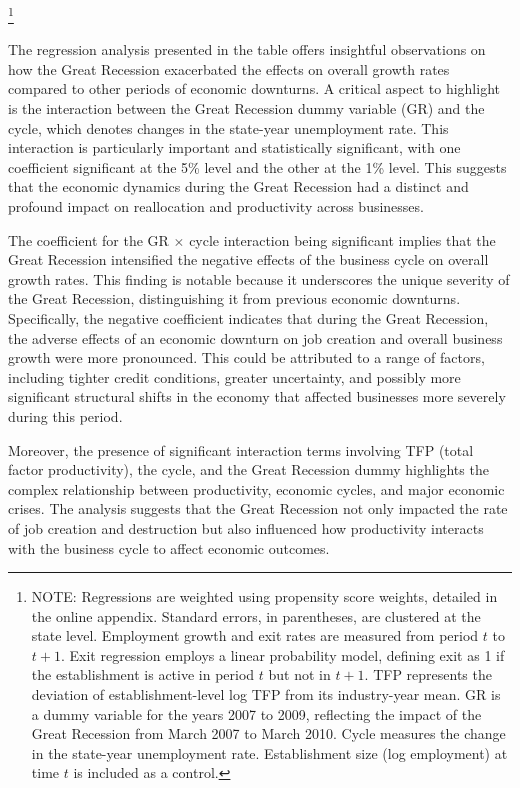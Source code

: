 \documentclass[12pt]{article}
\begin{document}
\begin{table}[ht]
    \footnote{NOTE: Regressions are weighted using propensity score weights, detailed in the online appendix. Standard errors, in parentheses, are clustered at the state level. Employment growth and exit rates are measured from period $t$ to $t+1$. Exit regression employs a linear probability model, defining exit as 1 if the establishment is active in period $t$ but not in $t+1$. TFP represents the deviation of establishment-level log TFP from its industry-year mean. GR is a dummy variable for the years 2007 to 2009, reflecting the impact of the Great Recession from March 2007 to March 2010. Cycle measures the change in the state-year unemployment rate. Establishment size (log employment) at time $t$ is included as a control.}  
\end{table}
The regression analysis presented in the table offers insightful observations on how the Great Recession exacerbated the
effects on overall growth rates compared to other periods of economic downturns. A critical aspect to highlight is the
interaction between the Great Recession dummy variable (GR) and the cycle, which denotes changes in the state-year
unemployment rate. This interaction is particularly important and statistically significant, with one coefficient
significant at the 5\% level and the other at the 1\% level. This suggests that the economic dynamics during the Great
Recession had a distinct and profound impact on reallocation and productivity across businesses. 

The coefficient for the GR $\times$ cycle interaction being significant implies that the Great Recession intensified the
negative effects of the business cycle on overall growth rates. This finding is notable because it underscores the
unique severity of the Great Recession, distinguishing it from previous economic downturns. Specifically, the negative
coefficient indicates that during the Great Recession, the adverse effects of an economic downturn on job creation and
overall business growth were more pronounced. This could be attributed to a range of factors, including tighter credit
conditions, greater uncertainty, and possibly more significant structural shifts in the economy that affected businesses
more severely during this period. 

Moreover, the presence of significant interaction terms involving TFP (total factor productivity), the cycle, and the
Great Recession dummy highlights the complex relationship between productivity, economic cycles, and major economic
crises. The analysis suggests that the Great Recession not only impacted the rate of job creation and destruction but
also influenced how productivity interacts with the business cycle to affect economic outcomes. 
\end{document}

